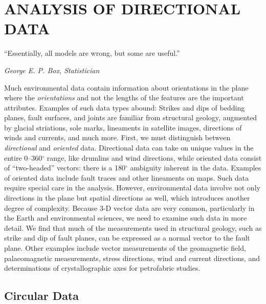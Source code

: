 %
\chapter{ANALYSIS OF DIRECTIONAL DATA}
\epigraph{``Essentially, all models are wrong, but some are useful.''}{\textit{George E. P. Box, Statistician}}

	Much environmental data contain information about orientations in the plane where the \emph{orientations} 
and not the lengths of the features are the important attributes.  Examples of such data types abound: Strikes and dips 
of bedding planes, fault surfaces, and joints are familiar from structural geology, augmented by glacial striations, sole marks, 
lineaments in satellite images, directions of winds and currents, and much more.  First, we must distinguish between 
\emph{directional} and \emph{oriented} data.  Directional data can take on unique values in the entire 0--360$^{\circ}$ 
range, like drumlins and wind directions, while oriented data consist of ``two-headed'' vectors: there is a 180$^{\circ}$ 
 ambiguity 
inherent in the data.  Examples of oriented data include fault traces and other lineaments on maps.  
Such data require special care in the analysis.
	However, environmental data involve not only directions in the plane but spatial directions as well, which  
introduces another degree of complexity.  Because 3-D vector data are very common, particularly in 
the Earth and environmental sciences, we need to examine such data in more detail.  We find that much of the 
measurements used in structural geology, such as strike and dip of fault planes, can be expressed
as a normal vector to the fault plane.  Other examples include vector measurements of the 
geomagnetic field, palaeomagnetic measurements, stress directions, wind and current directions, and determinations of 
crystallographic axes for petrofabric studies.


\section{Circular Data}

